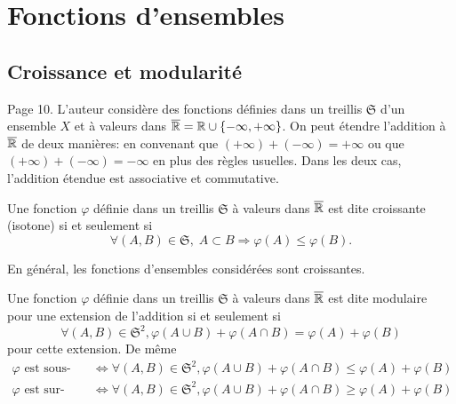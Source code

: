 \section{Fonctions d'ensembles}\label{Sec:FoncEns}
\subsection{Croissance et modularité} \label{SubSec:CroissModul}
Page 10. L'auteur considère des fonctions définies dans un treillis $\mathfrak{S}$ d'un ensemble $X$ et à valeurs dans $\overline{\mathbb{R}}= \mathbb{R} \cup\{- \infty, + \infty\} $. On peut étendre l'addition à $\overline{\mathbb{R}}$ de deux manières: en convenant que $(+ \infty) + (-\infty) = + \infty$ ou que $(+ \infty) + (-\infty) = - \infty$ en plus des règles usuelles. Dans les deux cas, l'addition étendue est associative et commutative.

\begin{defi}
  Une fonction $\varphi$ définie dans un treillis $\mathfrak{S}$ à valeurs dans $\overline{\mathbb{R}}$ est dite croissante (isotone) si et seulement si
  \begin{displaymath}
    \forall (A,B) \in \mathfrak{S},\; A \subset B \Rightarrow \varphi(A) \leq \varphi(B).
  \end{displaymath}
\end{defi}
\noindent En général, les fonctions d'ensembles considérées sont croissantes.

\begin{defi}
  Une fonction $\varphi$ définie dans un treillis $\mathfrak{S}$ à valeurs dans $\overline{\mathbb{R}}$ est dite modulaire pour une extension de l'addition si et seulement si
\begin{displaymath}
  \forall (A,B) \in \mathfrak{S}^2, \varphi(A \cup B) + \varphi(A \cap B) = \varphi(A) + \varphi(B)
\end{displaymath}
pour cette extension. De même
\begin{align*}
  \varphi \text{ est sous-modulaire } &\Leftrightarrow \forall (A,B) \in \mathfrak{S}^2, \varphi(A \cup B) + \varphi(A \cap B) \leq \varphi(A) + \varphi(B) \\
  \varphi \text{ est sur-modulaire } &\Leftrightarrow \forall (A,B) \in \mathfrak{S}^2, \varphi(A \cup B) + \varphi(A \cap B) \geq \varphi(A) + \varphi(B)
\end{align*}
\end{defi}

